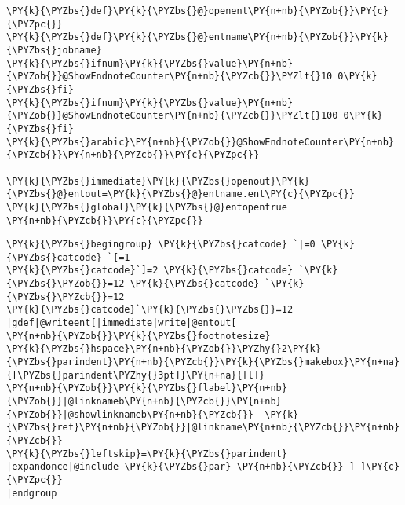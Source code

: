 \newwrite\@entout

%
%
%
\setcounter{@EndnoteCounter}{0}
\setcounter{@AllEndnoteCounter}{0}
\setcounter{@ShowEndnoteCounter}{1}

\newif\if@entopen \global\@entopenfalse

\begin{Verbatim}[commandchars=\\\{\}]
\PY{k}{\PYZbs{}def}\PY{k}{\PYZbs{}@}openent\PY{n+nb}{\PYZob{}}\PY{c}{\PYZpc{}}
\PY{k}{\PYZbs{}def}\PY{k}{\PYZbs{}@}entname\PY{n+nb}{\PYZob{}}\PY{k}{\PYZbs{}jobname}
\PY{k}{\PYZbs{}ifnum}\PY{k}{\PYZbs{}value}\PY{n+nb}{\PYZob{}}@ShowEndnoteCounter\PY{n+nb}{\PYZcb{}}\PYZlt{}10 0\PY{k}{\PYZbs{}fi}
\PY{k}{\PYZbs{}ifnum}\PY{k}{\PYZbs{}value}\PY{n+nb}{\PYZob{}}@ShowEndnoteCounter\PY{n+nb}{\PYZcb{}}\PYZlt{}100 0\PY{k}{\PYZbs{}fi}
\PY{k}{\PYZbs{}arabic}\PY{n+nb}{\PYZob{}}@ShowEndnoteCounter\PY{n+nb}{\PYZcb{}}\PY{n+nb}{\PYZcb{}}\PY{c}{\PYZpc{}}

\PY{k}{\PYZbs{}immediate}\PY{k}{\PYZbs{}openout}\PY{k}{\PYZbs{}@}entout=\PY{k}{\PYZbs{}@}entname.ent\PY{c}{\PYZpc{}}
\PY{k}{\PYZbs{}global}\PY{k}{\PYZbs{}@}entopentrue
\PY{n+nb}{\PYZcb{}}\PY{c}{\PYZpc{}}
\end{Verbatim}

\def\@openent{%
\def\@entname{\jobname
\ifnum\value{@ShowEndnoteCounter}<10 0\fi
\ifnum\value{@ShowEndnoteCounter}<100 0\fi
\arabic{@ShowEndnoteCounter}}%

\immediate\openout\@entout=\@entname.ent%
\global\@entopentrue
}%

\begin{Verbatim}[commandchars=\\\{\}]
\PY{k}{\PYZbs{}begingroup} \PY{k}{\PYZbs{}catcode} `|=0 \PY{k}{\PYZbs{}catcode} `[=1
\PY{k}{\PYZbs{}catcode}`]=2 \PY{k}{\PYZbs{}catcode} `\PY{k}{\PYZbs{}\PYZob{}}=12 \PY{k}{\PYZbs{}catcode} `\PY{k}{\PYZbs{}\PYZcb{}}=12
\PY{k}{\PYZbs{}catcode}`\PY{k}{\PYZbs{}\PYZbs{}}=12
|gdef|@writeent[|immediate|write|@entout[
\PY{n+nb}{\PYZob{}}\PY{k}{\PYZbs{}footnotesize}
\PY{k}{\PYZbs{}hspace}\PY{n+nb}{\PYZob{}}\PYZhy{}2\PY{k}{\PYZbs{}parindent}\PY{n+nb}{\PYZcb{}}\PY{k}{\PYZbs{}makebox}\PY{n+na}{[\PYZbs{}parindent\PYZhy{}3pt]}\PY{n+na}{[l]}
\PY{n+nb}{\PYZob{}}\PY{k}{\PYZbs{}flabel}\PY{n+nb}{\PYZob{}}|@linknameb\PY{n+nb}{\PYZcb{}}\PY{n+nb}{\PYZob{}}|@showlinknameb\PY{n+nb}{\PYZcb{}}  \PY{k}{\PYZbs{}ref}\PY{n+nb}{\PYZob{}}|@linkname\PY{n+nb}{\PYZcb{}}\PY{n+nb}{\PYZcb{}}
\PY{k}{\PYZbs{}leftskip}=\PY{k}{\PYZbs{}parindent}   |expandonce|@include \PY{k}{\PYZbs{}par} \PY{n+nb}{\PYZcb{}} ] ]\PY{c}{\PYZpc{}}
|endgroup
\end{Verbatim}

